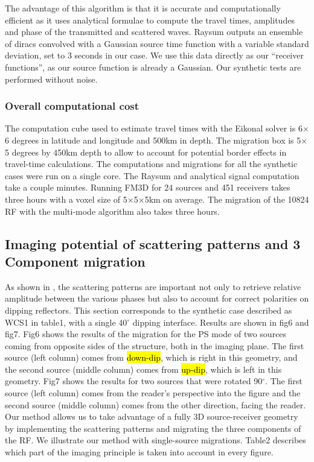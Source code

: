 \documentclass[10pt,a4paper]{article}
\numberwithin{equation}{section}
\DeclareRobustCommand{\rq}[1]{{\sethlcolor{myblue}\hl{#1}}}
\begin{document}
The advantage of this algorithm is that it is accurate and computationally efficient as it uses analytical formulae to compute the travel times, amplitudes and phase of the transmitted and scattered waves.
Raysum outputs an ensemble of diracs convolved with a Gaussian source time function with a variable standard deviation, set to 3 seconds in our case.
We use this data directly as our “receiver functions”, as our source function is already a Gaussian.
Our synthetic tests are performed without noise.

\subsubsection{Overall computational cost}

The computation cube used to estimate travel times with the Eikonal solver is 6$\times$6 degrees in latitude and longitude and 500km in depth.
The migration box is 5$\times$5 degrees by 450km depth to allow to account for potential border effects in travel-time calculations.
The computations and migrations for all the synthetic cases were run on a single core.
The Raysum and analytical signal computation take a couple minutes.
Running FM3D for 24 sources and 451 receivers takes three hours with a voxel size of 5$\times$5$\times$5km on average.
The migration of the 10824 RF with the multi-mode algorithm also takes three hours.

\subsection{Imaging potential of scattering patterns and 3 Component migration}

As shown in \cite{cheng_gji_16}, the scattering patterns are important not only to retrieve relative amplitude between the various phases but also to account for correct polarities on dipping reflectors.
This section corresponds to the synthetic case described as WCS1 in table1, with a single 40$^{\circ}$ dipping interface.
Results are shown in fig6 and fig7.
Fig6 shows the results of the migration for the PS mode of two sources coming from opposite sides of the structure, both in the imaging plane.
The first source (left column) comes from \hl{down-dip}, which is right in this geometry, and the second source (middle column) comes from \hl{up-dip}, which is left in this geometry.
Fig7 shows the results for two sources that were rotated 90$^{\circ}$.
The first source (left column) comes from the reader's perspective into the figure and the second source (middle column) comes from the other direction, facing the reader.
Our method allows us to take advantage of a fully 3D source-receiver geometry by implementing the scattering patterns and migrating the three components of the RF.
We illustrate our method with single-source migrations.
Table2 describes which part of the imaging principle is taken into account in every figure.
\end{document}
